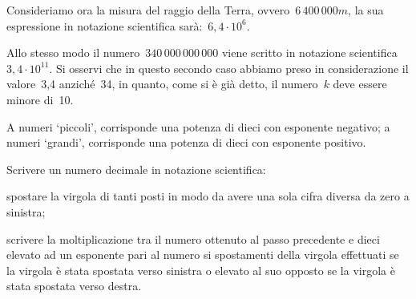 Consideriamo ora la misura del raggio della Terra, 
ovvero~\(6\,400\,000\unit{m}\),
la sua espressione in notazione scientifica sarà:~\(6,4\cdot10^6\).

Allo stesso modo il numero~\(340\,000\,000\,000\) viene scritto in notazione 
scientifica~\(3,4\cdot10^{11}\).
Si osservi che in questo secondo caso abbiamo preso in considerazione il 
valore~3,4 anziché~34, in quanto, come si è già detto, il numero~\(k\) deve 
essere minore di~10.

\osservazione A numeri `piccoli', corrisponde una potenza di dieci con 
esponente negativo; 
a numeri `grandi', corrisponde una potenza di dieci con esponente positivo.

\begin{procedura}
Scrivere un numero decimale in notazione scientifica:
\begin{enumeratea} %
 \item spostare la virgola di tanti posti in modo da avere una sola cifra
  diversa da zero a sinistra;
 \item scrivere la moltiplicazione tra il numero ottenuto al passo 
precedente
  e dieci elevato ad un esponente pari al numero si spostamenti della 
virgola 
  effettuati se la virgola è stata spostata verso sinistra o elevato al suo 
  opposto se la virgola è stata spostata verso destra.
\end{enumeratea}
\end{procedura}

